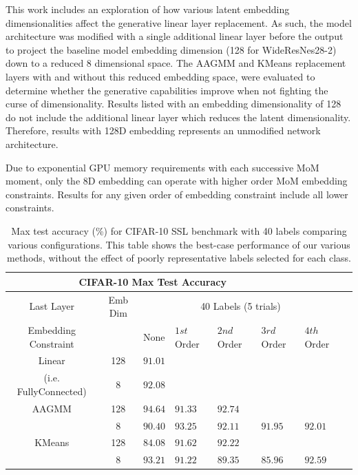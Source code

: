\documentclass[10pt,twocolumn,letterpaper]{article}
\begin{document}
This work includes an exploration of how various latent embedding dimensionalities affect the generative linear layer replacement.
As such, the model architecture was modified with a single additional linear layer before the output to project the baseline model embedding dimension (128 for WideResNes28-2) down to a reduced 8 dimensional space.
The AAGMM and KMeans replacement layers with and without this reduced embedding space, were evaluated to determine whether the generative capabilities improve when not fighting the curse of dimensionality.
Results listed with an embedding dimensionality of 128 do not include the additional linear layer which reduces the latent dimensionality. 
Therefore, results with 128D embedding represents an unmodified network architecture.

Due to exponential GPU memory requirements with each successive MoM moment, only the 8D embedding can operate with higher order MoM embedding constraints. Results for any given order of embedding constraint include all lower constraints.

\begin{table}[ht!]
	\begin{tabularx}{\textwidth}{c|c|XXXXXX}
		\multicolumn{6}{c}{CIFAR-10 Max Test Accuracy} \\ \hline\hline
		Last Layer &   Emb Dim   & \multicolumn{5}{c}{40 Labels (5 trials)}            \\ 
		\hline
		Embedding Constraint  &  & None & $1st$ Order & $2nd$ Order & $3rd$ Order & $4th$ Order  \\ 
		\hline
		Linear & 128  & $91.01$   &  &  &  &   \\
		(i.e. FullyConnected) & 8  & $92.08$    &  &  &  &   \\
		\hline
		AAGMM  & 128  & $\boldsymbol{94.64}$    & $91.33$   & $92.74$   &  &  \\
		& 8  & $90.40$    & $93.25$   & $92.11$   & $91.95$  & $92.01$  \\
		\hline
		KMeans & 128  & $84.08$    & $91.62$   & $92.22$  &  &  \\
		& 8  & $\boldsymbol{93.21}$    & $91.22$  & $89.35$  & $85.96$  & $92.59$  \\
	\end{tabularx}
	\caption{Max test accuracy (\%) for CIFAR-10 SSL benchmark with 40 labels comparing various configurations. This table shows the best-case performance of our various methods, without the effect of poorly representative labels selected for each class. }
	\label{tablemaxcf10}
\end{table}
\end{document}
